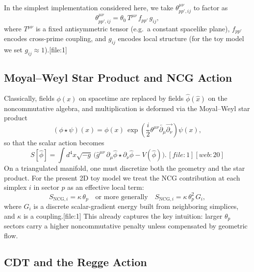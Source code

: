 \documentclass[11pt]{article}
\begin{document}
In the simplest implementation considered here, we take
\(\theta^{\mu\nu}_{pp',ij}\) to factor as
\begin{equation}
  \theta^{\mu\nu}_{pp',ij} =
    \theta_0\,T^{\mu\nu}\,f_{pp'}\,g_{ij},
\end{equation}
where \(T^{\mu\nu}\) is a fixed antisymmetric tensor (e.g.\ a constant
spacelike plane), \(f_{pp'}\) encodes cross-prime coupling, and \(g_{ij}\)
encodes local structure (for the toy model we set \(g_{ij} \approx 1\)).[file:1]

\subsection{Moyal--Weyl Star Product and NCG Action}

Classically, fields \(\phi(x)\) on spacetime are replaced by fields
\(\hat{\phi}(\hat{x})\) on the noncommutative algebra, and multiplication is
deformed via the Moyal--Weyl star product
\begin{equation}
  (\phi \star \psi)(x)
    = \phi(x)\,
      \exp\!\left(
        \frac{i}{2} \theta^{\mu\nu}
        \overleftarrow{\partial_\mu}
        \overrightarrow{\partial_\nu}
      \right)\!
      \psi(x),
\end{equation}
so that the scalar action becomes
\begin{equation}
  S[\hat{\phi}]
    = \int d^4 x \sqrt{-g}\,
      \bigl(
        \hat{g}^{\mu\nu}\,
        \partial_\mu \hat{\phi} \star
        \partial_\nu \hat{\phi}
        - V(\hat{\phi})
      \bigr).\,[file:1][web:20]
\end{equation}
On a triangulated manifold, one must discretize both the geometry and the
star product. For the present 2D toy model we treat the NCG contribution
at each simplex \(i\) in sector \(p\) as an effective local term:
\begin{equation}
  S_{\mathrm{NCG},i}
    = \kappa\,\theta_p
    \quad\text{or more generally}\quad
  S_{\mathrm{NCG},i} = \kappa\,\theta_p^2\,G_i,
\end{equation}
where \(G_i\) is a discrete scalar-gradient energy built from neighboring
simplices, and \(\kappa\) is a coupling.[file:1] This already captures the key
intuition: larger \(\theta_p\) sectors carry a higher noncommutative
penalty unless compensated by geometric flow.

\subsection{CDT and the Regge Action}
\end{document}
